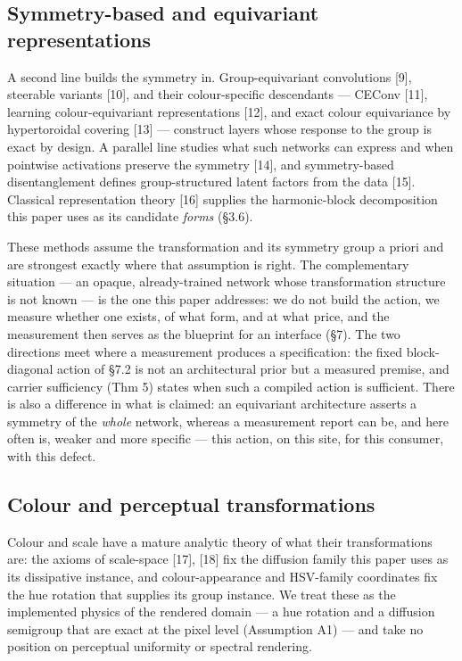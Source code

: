 \subsection{Symmetry-based and equivariant representations}

A second line builds the symmetry in. Group-equivariant convolutions [9], steerable variants [10], and their colour-specific descendants --- CEConv [11], learning colour-equivariant representations [12], and exact colour equivariance by hypertoroidal covering [13] --- construct layers whose response to the group is exact by design. A parallel line studies what such networks can express and when pointwise activations preserve the symmetry [14], and symmetry-based disentanglement defines group-structured latent factors from the data [15]. Classical representation theory [16] supplies the harmonic-block decomposition this paper uses as its candidate \textit{forms} (\S{}3.6).

These methods assume the transformation and its symmetry group a priori and are strongest exactly where that assumption is right. The complementary situation --- an opaque, already-trained network whose transformation structure is not known --- is the one this paper addresses: we do not build the action, we measure whether one exists, of what form, and at what price, and the measurement then serves as the blueprint for an interface (\S{}7). The two directions meet where a measurement produces a specification: the fixed block-diagonal action of \S{}7.2 is not an architectural prior but a measured premise, and carrier sufficiency (Thm 5) states when such a compiled action is sufficient. There is also a difference in what is claimed: an equivariant architecture asserts a symmetry of the \textit{whole} network, whereas a measurement report can be, and here often is, weaker and more specific --- this action, on this site, for this consumer, with this defect.

\subsection{Colour and perceptual transformations}

Colour and scale have a mature analytic theory of what their transformations are: the axioms of scale-space [17], [18] fix the diffusion family this paper uses as its dissipative instance, and colour-appearance and HSV-family coordinates fix the hue rotation that supplies its group instance. We treat these as the implemented physics of the rendered domain --- a hue rotation and a diffusion semigroup that are exact at the pixel level (Assumption A1) --- and take no position on perceptual uniformity or spectral rendering.

